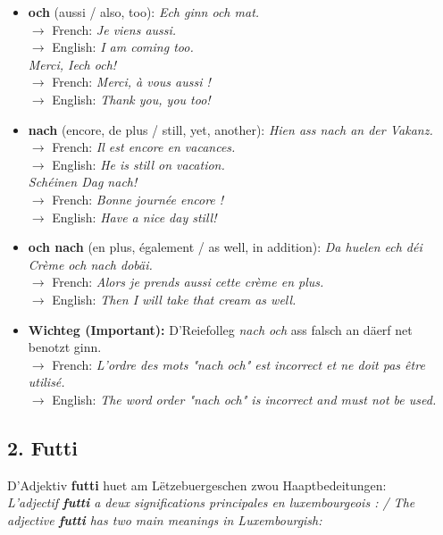 \begin{itemize}
    \item \textbf{och} (aussi / also, too):
    \textit{Ech ginn och mat.} \\
    $\rightarrow$ French: \textit{Je viens aussi.} \\
    $\rightarrow$ English: \textit{I am coming too.} \\
    \textit{Merci, Iech och!} \\
    $\rightarrow$ French: \textit{Merci, à vous aussi !} \\
    $\rightarrow$ English: \textit{Thank you, you too!}
    
    \item \textbf{nach} (encore, de plus / still, yet, another):
    \textit{Hien ass nach an der Vakanz.} \\
    $\rightarrow$ French: \textit{Il est encore en vacances.} \\
    $\rightarrow$ English: \textit{He is still on vacation.} \\
    \textit{Schéinen Dag nach!} \\
    $\rightarrow$ French: \textit{Bonne journée encore !} \\
    $\rightarrow$ English: \textit{Have a nice day still!}
    
    \item \textbf{och nach} (en plus, également / as well, in addition):
    \textit{Da huelen ech déi Crème och nach dobäi.} \\
    $\rightarrow$ French: \textit{Alors je prends aussi cette crème en plus.} \\
    $\rightarrow$ English: \textit{Then I will take that cream as well.}
    
    \item \textbf{Wichteg (Important):} D'Reiefolleg \textit{nach och} ass falsch an däerf net benotzt ginn. \\
    $\rightarrow$ French: \textit{L'ordre des mots "nach och" est incorrect et ne doit pas être utilisé.} \\
    $\rightarrow$ English: \textit{The word order "nach och" is incorrect and must not be used.}
\end{itemize}

\subsection*{2. Futti}
D'Adjektiv \textbf{futti} huet am Lëtzebuergeschen zwou Haaptbedeitungen: \\
\textit{L'adjectif \textbf{futti} a deux significations principales en luxembourgeois : / The adjective \textbf{futti} has two main meanings in Luxembourgish:}

